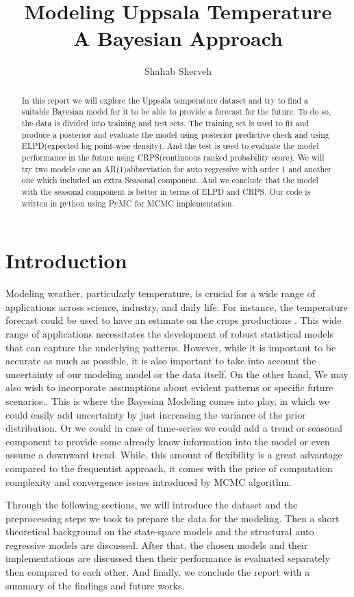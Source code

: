 \documentclass{IEEEtran}
\title{Modeling Uppsala Temperature \\ A Bayesian Approach}
\author{Shahab Sherveh}
\begin{document}
    \maketitle
    \begin{abstract}
      In this report we will explore the Uppsala temperature dataset and try to find a suitable Bayesian model for it to be able to provide a forecast for the future. To do so, the data is divided into training and test sets. The training set is used to fit and produce a posterior and evaluate the model using posterior predictive check and using ELPD(expected log point-wise density). And the test is used to evaluate the model performance in the future using CRPS(continuous ranked probability score). We will try two models one an AR(1)abbreviation for auto regressive with order 1 and another one which included an extra Seasonal component. And we conclude that the model with the seasonal component is better in terms of ELPD and CRPS. Our code is written in python using PyMC for MCMC implementation.
    \end{abstract}

    \section{Introduction}
    Modeling weather, particularly temperature, is crucial for a wide range of applications across science, industry, and daily life. For instance, the temperature forecast could be used to have an estimate on the crops productions \cite{Lobell_2007}. This wide range of applications necessitates the development of robust statistical models that can capture the underlying patterns. However, while it is important to be accurate as much as possible, it is also important to take into account the uncertainty of our modeling model or the data itself. On the other hand, We may also wish to incorporate assumptions about evident patterns or specific future scenarios.. This is where the Bayesian Modeling comes into play, in which we could easily add uncertainty by just increasing the variance of the prior distribution. Or we could in case of time-series we could add a trend or seasonal component to provide some already know information into the model or even assume a downward trend. While, this amount of flexibility is a great advantage compared to the frequentist approach, it comes with the price of computation complexity and convergence issues introduced by MCMC algorithm.

    Through the following sections, we will introduce the dataset and the preprocessing steps we took to prepare the data for the modeling. Then a short theoretical background on the state-space models and the structural auto regressive models are discussed. After that, the chosen models and their implementations are discussed then their performance is evaluated separately then compared to each other. And finally, we conclude the report with a summary of the findings and future works.
\end{document}
